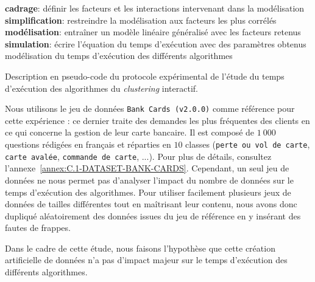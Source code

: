 \begin{algorithm}[!htb]
\begin{algorithmic}[1]
					\EndFor
						\State \textbf{cadrage}: définir les facteurs et les interactions intervenant dans la modélisation
						\State \textbf{simplification}: restreindre la modélisation aux facteurs les plus corrélés
						\State \textbf{modélisation}: entraîner un modèle linéaire généralisé avec les facteurs retenus
						\State \textbf{simulation}: écrire l'équation du temps d'exécution avec des paramètres obtenus
					\EndFor
					\Ensure modélisation du temps d'exécution des différents algorithmes
				\end{algorithmic}
				\caption{Description en pseudo-code du protocole expérimental de l'étude du temps d'exécution des algorithmes du \textit{clustering} interactif.}
				\label{algorithm:4.3.2-ETUDE-COUTS-TEMPS-CALCUL-PROTOCOLE}
			\end{algorithm}
			
			Nous utilisons le jeu de données \texttt{Bank Cards (v2.0.0)} comme référence pour cette expérience : ce dernier traite des demandes les plus fréquentes des clients en ce qui concerne la gestion de leur carte bancaire.
			Il est composé de $1~000$ questions rédigées en français et réparties en $10$ classes (\texttt{perte ou vol de carte}, \texttt{carte avalée}, \texttt{commande de carte}, ...).
			Pour plus de détails, consultez l'annexe~\ref{annex:C.1-DATASET-BANK-CARDS}.
			Cependant, un seul jeu de données ne nous permet pas d'analyser l'impact du nombre de données sur le temps d'exécution des algorithmes.
			Pour utiliser facilement plusieurs jeux de données de tailles différentes tout en maîtrisant leur contenu, nous avons donc dupliqué aléatoirement des données issues du jeu de référence en y insérant des fautes de frappes.
			
			\begin{leftBarWarning}
				Dans le cadre de cette étude, nous faisons l'hypothèse que cette création artificielle de données n'a pas d'impact majeur sur le temps d'exécution des différents algorithmes.
			\end{leftBarWarning}
			
